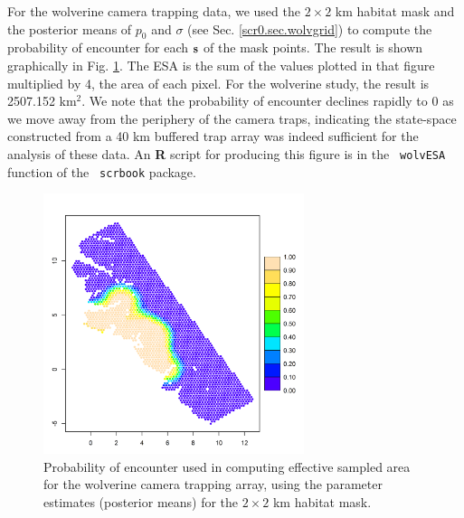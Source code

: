 {For the wolverine camera trapping data, we used the
$2 \times 2$ km habitat mask and the posterior means of $p_{0}$ and $\sigma$ (see
Sec. \ref{scr0.sec.wolvgrid}) to compute the
probability of encounter for each ${\bf s}$ of the mask points. The
result is shown graphically in Fig. \ref{scr0.fig.esa}. The ESA
is the sum of the values plotted in that figure multiplied by 4, the
area of each pixel. For the wolverine study, the result is
2507.152 km$^2$. We note that the probability of encounter declines
rapidly to 0 as we move away from the periphery of the camera traps,
indicating the state-space constructed from a 40 km buffered trap
array was indeed sufficient for the analysis of these data.
An {\bf R} script for producing this figure is in the \mbox{\tt
  wolvESA} function of the  \mbox{\tt
  scrbook} package.

\begin{figure}[ht]
\begin{center}
\includegraphics[height=3in]{Ch4-SCR0/figs/wolv_esa}
\end{center}
\caption{Probability of encounter used in computing effective sampled
  area for the wolverine camera trapping array, using the parameter
  estimates (posterior means) for the $2 \times 2$ km habitat mask.  }
\label{scr0.fig.esa}
\end{figure}

















}
